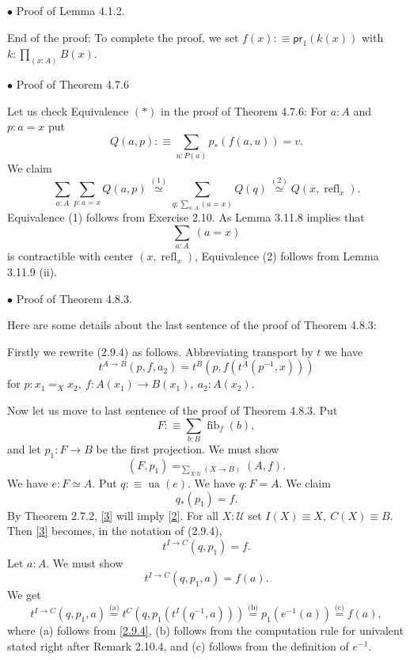 \documentclass[12pt]{article}
\newcommand{\ee}{\equiv}
\newcommand{\msf}{\mathsf}
\newcommand{\nn}{\noindent}
\newcommand{\oo}{\operatorname}
\newcommand{\U}{\mathcal U}
\begin{document}

\nn$\bullet$ Proof of Lemma 4.1.2.

End of the proof: To complete the proof, we set $f(x):\ee\msf{pr}_1(k(x))$ with $k:\prod_{(x:A)}B(x)$.





\nn$\bullet$ Proof of Theorem 4.7.6

Let us check Equivalence $(*)$ in the proof of Theorem 4.7.6: For $a:A$ and $p:a=x$ put 
$$
Q(a,p):\equiv\sum_{u:P(a)}p_*(f(a,u))=v.
$$ 
We claim 
$$
\sum_{a:A}\sum_{p:a=x}Q(a,p)\overset{(1)}{\simeq}
\sum_{q:\sum_{a:A}(a=x)}Q(q)\overset{(2)}{\simeq}
Q(x,\oo{refl}_x).
$$
Equivalence (1) follows from Exercise 2.10. As Lemma 3.11.8 implies that $$\sum_{a:A}\ (a=x)$$ is contractible with center $(x,\oo{refl}_x)$, Equivalence (2) follows from Lemma 3.11.9 (ii). 


\nn$\bullet$ Proof of Theorem 4.8.3. 

Here are some details about the last sentence of the proof of Theorem 4.8.3:

Firstly we rewrite (2.9.4) as follows. Abbreviating transport by $t$ we have 
\begin{equation}\label{2.9.4}
t^{A\to B}(p,f,a_2)=t^B(p,f(t^A(p^{-1},x)))
\end{equation}
for $p:x_1=_Xx_2,\ f:A(x_1)\to B(x_1),\ a_2:A(x_2)$. 

Now let us move to last sentence of the proof of Theorem 4.8.3. Put
$$
F:\equiv\sum_{b:B}\oo{fib}_f(b),
$$ 
and let $p_1:F\to B$ be the first projection. We must show 
\begin{equation}\label{2}
(F,p_1)=_{\sum_{X:\U}(X\to B)}(A,f).
\end{equation} 
We have $e:F\simeq A$. Put $q:\equiv\oo{ua}(e)$. We have $q:F=A$. We claim 
\begin{equation}\label{3}
q_*(p_1)=f.
\end{equation} 
By Theorem 2.7.2, \eqref{3} will imply \eqref{2}. For all $X:\U$ set $I(X)\equiv X,\ C(X)\equiv B$. Then \eqref{3} becomes, in the notation of (2.9.4), 
$$
t^{I\to C}(q,p_1)=f.
$$ 
Let $a:A$. We must show 
$$
t^{I\to C}(q,p_1,a)=f(a).
$$ 
We get 
$$
t^{I\to C}(q,p_1,a)\overset{\text{(a)}}=t^C(q,p_1(t^I(q^{-1},a)))\overset{\text{(b)}}=p_1(e^{-1}(a))\overset{\text{(c)}}=f(a),
$$ 
where (a) follows from \eqref{2.9.4}, (b) follows from the computation rule for univalent stated right after Remark 2.10.4, and (c) follows from the definition of $e^{-1}$.
\end{document}
